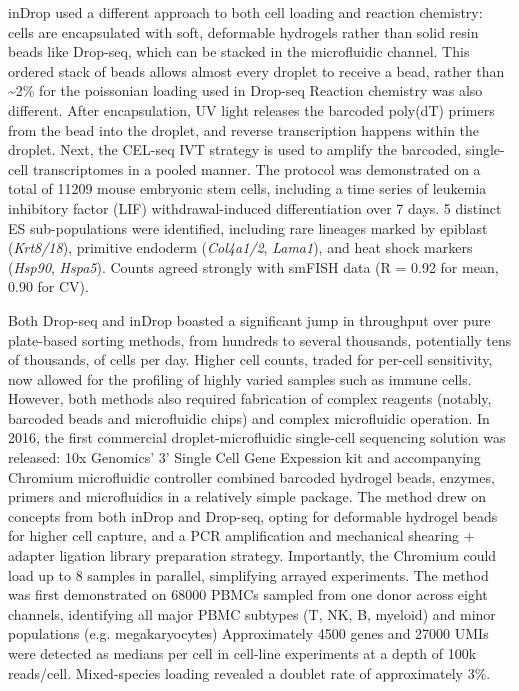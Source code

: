 inDrop used a different approach to both cell loading and reaction chemistry: cells are encapsulated with soft, deformable hydrogels rather than solid resin beads like Drop-seq, which can be stacked in the microfluidic channel. This ordered stack of beads allows almost every droplet to receive a bead, rather than \textasciitilde{2}\% for the poissonian loading used in Drop-seq Reaction chemistry was also different. After encapsulation, UV light releases the barcoded poly(dT) primers from the bead into the droplet, and reverse transcription happens within the droplet. Next, the CEL-seq IVT strategy is used to amplify the barcoded, single-cell transcriptomes in a pooled manner. The protocol was demonstrated on a total of \num{11209} mouse embryonic stem cells, including a time series of leukemia inhibitory factor (LIF) withdrawal-induced differentiation over 7 days. 5 distinct ES sub-populations were identified, including rare lineages marked by epiblast (\textit{Krt8/18}), primitive endoderm (\textit{Col4a1/2}, \textit{Lama1}), and heat shock markers (\textit{Hsp90}, \textit{Hspa5}). Counts agreed strongly with smFISH data (R = 0.92 for mean, 0.90 for CV).

Both Drop-seq and inDrop boasted a significant jump in throughput over pure plate-based sorting methods, from hundreds to several thousands, potentially tens of thousands, of cells per day. Higher cell counts, traded for per-cell sensitivity, now allowed for the profiling of highly varied samples such as immune cells. However, both methods also required fabrication of complex reagents (notably, barcoded beads and microfluidic chips) and complex microfluidic operation. In 2016, the first commercial droplet-microfluidic single-cell sequencing solution was released: 10x Genomics' 3' Single Cell Gene Expession kit and accompanying Chromium microfluidic controller combined barcoded hydrogel beads, enzymes, primers and microfluidics in a relatively simple package. The method drew on concepts from both inDrop and Drop-seq, opting for deformable hydrogel beads for higher cell capture, and a PCR amplification and mechanical shearing + adapter ligation library preparation strategy. Importantly, the Chromium could load up to 8 samples in parallel, simplifying arrayed experiments. The method was first demonstrated on \num{68000} PBMCs sampled from one donor across eight channels, identifying all major PBMC subtypes (T, NK, B, myeloid) and minor populations (e.g. megakaryocytes) Approximately \num{4500} genes and \num{27000} UMIs were detected as medians per cell in cell-line experiments at a depth of 100k reads/cell. Mixed-species loading revealed a doublet rate of approximately 3\%.

